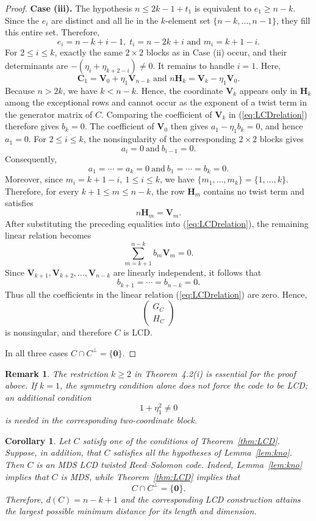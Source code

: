 \documentclass[12pt,draftcls,journal,onecolumn]{IEEEtran}
\newtheorem{remark}[theorem]{Remark}
\newtheorem{corollary}[theorem]{Corollary}
\begin{document}
\begin{proof}
\medskip
\noindent\textbf{Case (iii).}
The hypothesis $n\le2k-1+t_1$ is equivalent to $e_1\ge n-k$. Since the $e_i$ are distinct and all lie in the $k$-element set $\{n-k,\ldots,n-1\}$, they fill this entire set. Therefore,
\[
e_i=n-k+i-1,
\;
t_i=n-2k+i \text{ and }
m_i=k+1-i.
\]
For $2\le i\le k$, exactly the same $2\times2$ blocks as in Case (ii) occur, and their determinants are
\(
-(\eta_i+\eta_{k+2-i})\ne0.
\)
It remains to handle $i=1$. Here,
\[
\mathbf{C}_1=\mathbf{V}_0+\eta_1\mathbf{V}_{n-k} \text{ and }n\mathbf{H}_k=\mathbf{V}_k-\eta_1\mathbf{V}_0.
\]
Because \(n>2k\), we have \(k<n-k\). Hence, the coordinate
\(\mathbf{V}_k\) appears only in \(\mathbf{H}_k\) among the exceptional rows and
cannot occur as the exponent of a twist term in the generator matrix of \(C\). Comparing the coefficient of \(\mathbf{V}_k\) in (\ref{eq:LCDrelation}) therefore gives $b_k=0$. The coefficient of \(\mathbf{V}_0\) then gives $a_1-\eta_1b_k=0$,
and hence \(a_1=0\). For \(2\leq i\leq k\), the nonsingularity of the corresponding \(2\times2\) blocks gives
\[
a_i=0\ \text{and}\ b_{i-1}=0.
\]
Consequently,
\[
a_1=\cdots=a_k=0\ \text{and}\ b_1=\cdots=b_k=0.
\]
Moreover, since $m_i=k+1-i,\ 1\leq i\leq k$, we have $\{m_1,\ldots,m_k\}=\{1,\ldots,k\}$. Therefore, for every \(k+1\leq m\leq n-k\), the row \(\mathbf{H}_m\)
contains no twist term and satisfies
\[
n\mathbf{H}_m=\mathbf{V}_m.
\]
After substituting the preceding equalities into (\ref{eq:LCDrelation}), the
remaining linear relation becomes
\[
\sum_{m=k+1}^{n-k} b_m\mathbf{V}_m=0.
\]
Since $\mathbf{V}_{k+1},\mathbf{V}_{k+2},\ldots,\mathbf{V}_{n-k}$ are linearly independent, it follows that
\[
b_{k+1}=\cdots=b_{n-k}=0.
\]
Thus all the coefficients in the linear relation (\ref{eq:LCDrelation}) are
zero. Hence,
\[
\begin{pmatrix}
G_C\\
H_C
\end{pmatrix}
\]
is nonsingular, and therefore \(C\) is LCD.


In all three cases $C\cap C^\perp=\{\mathbf{0}\}$.
\end{proof}

\begin{remark}
The restriction $k\ge2$ in Theorem~4.2(i) is essential for the proof above. If $k=1$, the symmetry condition alone does not force the code to be LCD; an additional condition
\[
1+\eta_1^2\ne0
\]
is needed in the corresponding two-coordinate block.
\end{remark}

\begin{corollary}
Let $C$ satisfy one of the conditions of Theorem~\ref{thm:LCD}. Suppose, in addition, that $C$ satisfies all the hypotheses of Lemma~\ref{lem:kno}. Then $C$ is an MDS LCD twisted Reed--Solomon code. Indeed, Lemma~\ref{lem:kno} implies that $C$ is MDS, while Theorem~\ref{thm:LCD} implies that
\[
C\cap C^\perp=\{\mathbf{0}\}.
\]
Therefore,
\(
d(C)=n-k+1
\)
and the corresponding LCD construction attains the largest possible minimum distance for its length and dimension.
\end{corollary}
\end{document}
